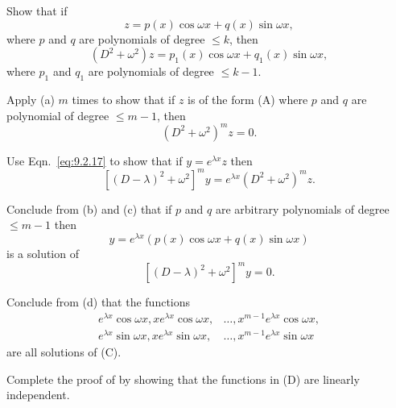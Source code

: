 \begin{exerciselist}
\item\label{exer:9.2.41}\begin{alist}
\item %
Show that if
\[
z=p(x)\cos\omega x+q(x)\sin\omega x,
\tag{A}
\]
where $p$ and $q$ are polynomials of degree $\le k$, then
\[
(D^2+\omega^2)z=p_1(x)\cos\omega x+q_1(x)\sin\omega x,
\]
where $p_1$ and $q_1$ are polynomials of degree $\le k-1$.

\item %
Apply (a) $m$ times to show that if $z$ is of
the form (A) where $p$ and $q$ are polynomial of
degree $\le m-1$, then
\[
(D^2+\omega^2)^mz=0.
\tag{B}
\]

\item %
Use Eqn.~\eqref{eq:9.2.17} to show that if $y=e^{\lambda x}z$ then
\[
[(D-\lambda)^2+\omega^2]^my=e^{\lambda
x}(D^2+\omega^2)^mz.
\]

\item %
Conclude from (b) and (c) that if $p$ and $q$ are arbitrary
polynomials of degree $\le m-1$ then
\[
y=e^{\lambda x}(p(x)\cos\omega x+q(x)\sin\omega x)
\]
is a solution of
\[
[(D-\lambda)^2+\omega^2]^my=0.
\tag{C}
\]

\item %
Conclude from (d) that the functions
\[
\begin{aligned}
e^{\lambda x}\cos\omega x, xe^{\lambda x}\cos\omega x,
&\dots, x^{m-1}e^{\lambda x}\cos\omega x,\\
e^{\lambda x}\sin\omega x, xe^{\lambda x}\sin\omega x,&
\dots, x^{m-1}e^{\lambda x}\sin\omega x
\end{aligned}
\tag{D}
\]
are all solutions of (C).

\item %
Complete the proof of  by showing that the
functions in (D) are linearly independent.
\end{alist}


\end{exerciselist}
